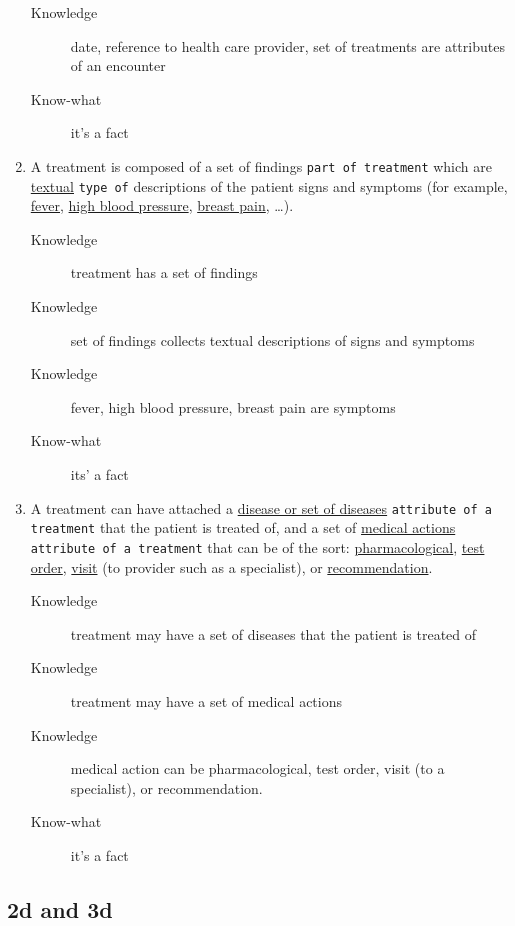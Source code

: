 \documentclass[a4paper,10pt,twoside,twocolumn]{article}
\begin{document}
\begin{enumerate}
\begin{description}
\item[{Knowledge}] date, reference to health care provider, set of treatments are attributes of an encounter
\item[{Know-what}] it's a fact
\end{description}
\item A treatment is composed of a set of findings \texttt{part of treatment} which are \uline{textual} \texttt{type of} descriptions of the patient signs and symptoms (for example, \uline{fever}, \uline{high blood pressure}, \uline{breast pain}, \ldots{}).
\begin{description}
\item[{Knowledge}] treatment has a set of findings
\item[{Knowledge}] set of findings collects textual descriptions of signs and symptoms
\item[{Knowledge}] fever, high blood pressure, breast pain are symptoms
\item[{Know-what}] its' a fact
\end{description}
\item A treatment can have attached a \uline{disease or set of diseases} \texttt{attribute of a treatment} that the patient is treated of, and a set of \uline{medical actions} \texttt{attribute of a treatment} that can be of the sort: \uline{pharmacological}, \uline{test order}, \uline{visit} (to provider such as a specialist), or \uline{recommendation}.
\begin{description}
\item[{Knowledge}] treatment may have a set of diseases that the patient is treated of
\item[{Knowledge}] treatment may have a set of medical actions
\item[{Knowledge}] medical action can be pharmacological, test order, visit (to a specialist), or recommendation.
\item[{Know-what}] it's a fact
\end{description}
\end{enumerate}

\subsection{2d and 3d}
\label{sec:org307b2b9}
\end{document}

